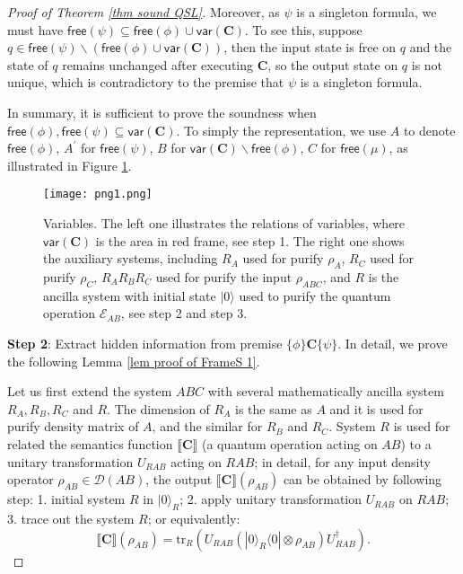 \documentclass[conference,compsoc, 10pt]{IEEEtran}
\newcommand {\cD } {{\mathcal{D}}}
\newcommand {\cE } {{\mathcal{E}}}
\newcommand {\free }[1] {{\mathsf{free}\left(#1\right)}}
\newcommand {\tr } {{\mathrm{tr}}}
\newcommand {\var } {\mathsf{var}}
\newcommand {\prog } {{\mathbf{C}}}
\newcommand {\sem}[1] {\llbracket#1\rrbracket}
\def\>{\ensuremath{\rangle}}
\def\<{\ensuremath{\langle}}
\begin{document}
\begin{appendices}
\begin{proof}[Proof of Theorem \ref{thm sound QSL}]
			Moreover, as $\psi$ is a singleton formula, we must have $\free{\psi}\subseteq\free{\phi}\cup\var(\prog)$. To see this, suppose $q\in\free{\psi}\backslash(\free{\phi}\cup\var(\prog))$, then the input state is free on $q$ and the state of $q$ remains unchanged after executing $\prog$, so the output state on $q$ is not unique, which is contradictory to the premise that $\psi$ is a singleton formula.
			
			In summary, it is sufficient to prove the soundness when $\free{\phi},\free{\psi}\subseteq\var(\prog)$. To simply the representation, we use $A$ to denote $\free{\phi}$, $A^\prime$ for $\free{\psi}$, $B$ for $\var(\prog)\backslash \free{\phi}$, $C$ for $\free{\mu}$, as illustrated in Figure \ref{fig proof of FrameS 1}.
			
			\begin{figure}
				\centering
				\texttt{[image: png1.png]}
				\caption{Variables. The left one illustrates the relations of variables, where $\var(\prog)$ is the area in red frame, see step 1. The right one shows the auxiliary systems, including $R_A$ used for purify $\rho_A$, $R_C$ used for purify $\rho_C$, $R_AR_BR_C$ used for purify the input $\rho_{ABC}$, and $R$ is the ancilla system with initial state $|0\>$ used to purify the quantum operation $\cE_{AB}$, see step 2 and step 3. }
				\label{fig proof of FrameS 1}
			\end{figure}
			
			\noindent\textbf{Step 2}: Extract hidden information from premise $\{\phi\}\prog\{\psi\}$.  In detail, we prove the following Lemma \ref{lem proof of FrameS 1}.
			
			Let us first extend the system $ABC$ with several mathematically ancilla system $R_A,R_B,R_C$ and $R$. The dimension of $R_A$ is the same as $A$ and it is used for purify density matrix of $A$, and the similar for $R_B$ and $R_C$. System $R$ is used for related the semantics function $\sem{\prog}$ (a quantum operation acting on $AB$) to a unitary transformation $U_{RAB}$ acting on $RAB$; in detail, for any input density operator $\rho_{AB}\in\cD(AB)$, the output $\sem{\prog}(\rho_{AB})$ can be obtained by following step:
			1. initial system $R$ in $|0\>_R$; 2. apply unitary transformation $U_{RAB}$ on $RAB$; 3. trace out the system $R$; or equivalently:
			$$\sem{\prog}(\rho_{AB}) = \tr_{R}\left( U_{RAB} (|0\>_R\<0|\otimes\rho_{AB}) U_{RAB}^\dag \right).$$
			

\end{proof}
\end{appendices}
\end{document}
